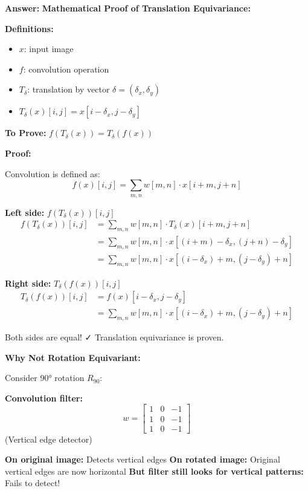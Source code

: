 \documentclass[12pt]{article}
\newcommand{\answer}[1]{{\color{answercolor}\textbf{Answer:} #1}}
\newcommand{\explanation}[1]{{\color{explanationcolor}#1}}
\begin{document}
\begin{enumerate}[(a)]
    \answer{
    \textbf{Mathematical Proof of Translation Equivariance:}
    
    \explanation{
    \textbf{Definitions:}
    \begin{itemize}
        \item $x$: input image
        \item $f$: convolution operation
        \item $T_\delta$: translation by vector $\delta = (\delta_x, \delta_y)$
        \item $T_\delta(x)[i,j] = x[i-\delta_x, j-\delta_y]$
    \end{itemize}
    
    \textbf{To Prove:} $f(T_\delta(x)) = T_\delta(f(x))$
    }
    
    \textbf{Proof:}
    
    \explanation{
    Convolution is defined as:
    \[f(x)[i,j] = \sum_{m,n} w[m,n] \cdot x[i+m, j+n]\]
    
    \textbf{Left side:} $f(T_\delta(x))[i,j]$
    \begin{align}
    f(T_\delta(x))[i,j] &= \sum_{m,n} w[m,n] \cdot T_\delta(x)[i+m, j+n]\\
    &= \sum_{m,n} w[m,n] \cdot x[(i+m)-\delta_x, (j+n)-\delta_y]\\
    &= \sum_{m,n} w[m,n] \cdot x[(i-\delta_x)+m, (j-\delta_y)+n]
    \end{align}
    
    \textbf{Right side:} $T_\delta(f(x))[i,j]$
    \begin{align}
    T_\delta(f(x))[i,j] &= f(x)[i-\delta_x, j-\delta_y]\\
    &= \sum_{m,n} w[m,n] \cdot x[(i-\delta_x)+m, (j-\delta_y)+n]
    \end{align}
    
    Both sides are equal! ✓ Translation equivariance is proven.
    }
    
    \textbf{Why Not Rotation Equivariant:}
    
    \explanation{
    Consider 90° rotation $R_{90}$:
    
    \textbf{Convolution filter:}
    \[w = \begin{bmatrix} 1 & 0 & -1 \\ 1 & 0 & -1 \\ 1 & 0 & -1 \end{bmatrix}\]
    (Vertical edge detector)
    
    \textbf{On original image:} Detects vertical edges
    \textbf{On rotated image:} Original vertical edges are now horizontal
    \textbf{But filter still looks for vertical patterns:} Fails to detect!
    
}}
\end{enumerate}
\end{document}
